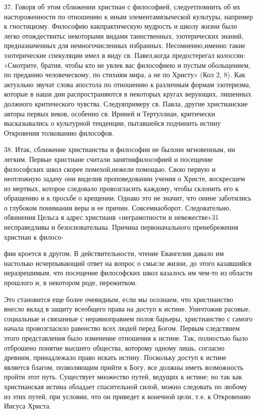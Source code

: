 \documentclass[a5paper,10pt]{article}
\begin{document}
37. Говоря об этом сближении христиан с философией, следуетпомнить об их
настороженности по отношению к иным элементамязыческой культуры, например к
гностицизму. Философию какпрактическую мудрость и школу жизни было легко
отождествитьс некоторыми видами таинственных, эзотерических знаний,
предназначенных для немногочисленных избранных. Несомненно,именно такие
эзотерические спекуляции имел в виду св. Павел,когда предостерегал колоссян:
«Смотрите, братия, чтобы кто не увлек вас философиею и пустым обольщением, по
преданию человеческому, по стихиям мира, а не по Христу» (Кол 2, 8). Как
актуально звучат слова апостола по отношению к различным формам эзотеризма,
которые в наши дни распространяются в некоторых кругах верующих, лишенных
должного критического чувства. Следуяпримеру св. Павла, другие христианские
авторы первых веков, особенно св. Ириней и Тертуллиан, критически высказывались
о культурной тенденции, пытавшейся подчинить истину Откровения толкованию
философов.

38. Итак, сближение христианства и философии не былони мгновенным, ни легким.
Первые христиане считали занятияфилософией и посещение философских школ скорее
помехой,нежели помощью. Свою первую и неотложную задачу они виделив
проповедовании учения о Христе, воскресшем из мертвых, которое следовало
провозгласить каждому, чтобы склонить его к обращению и к просьбе о крещении.
Однако это не значит, что онине заботились о глубоком понимании веры и ее
причин. Совсемнаоборот. Следовательно, обвинения Цельса в адрес христианв
«неграмотности и невежестве»31 несправедливы и безосновательны. Причина
первоначального пренебрежения христиан к филосо-

фии кроется в другом. В действительности, чтение Евангелия давало им настолько
исчерпывающий ответ на вопрос о смысле жизни, до этого казавшийся неразрешимым,
что посещение философских школ казалось им чем-то из области прошлого и, в
некотором роде, пережитком.

Это становится еще более очевидным, если мы осознаем, что христианство внесло
вклад в защиту всеобщего права на доступ к истине. Уничтожив расовые,
социальные и связанные с неравноправием полов барьеры, христианство с самого
начала провозгласило равенство всех людей перед Богом. Первым следствием этого
представления было изменение отношения к истине. Так, полностью было отброшено
понятие высшего общества, которому одному лишь, согласно древним, принадлежало
право искать истину. Поскольку доступ к истине является благом, позволяющим
прийти к Богу, все должны иметь возможность пройти этот путь. Существует
множество путей, ведущих к истине; но так как христианская истина обладает
спасительной силой, можно следовать по любому из этих путей, при условии, что
он приведет к конечной цели, т.е. к Откровению Иисуса Христа.
\end{document}
